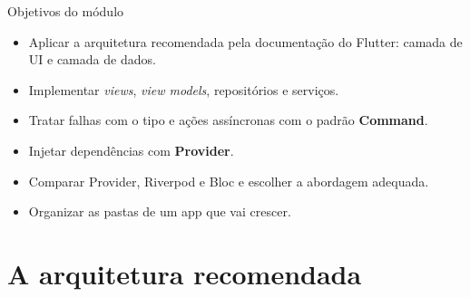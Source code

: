 \documentclass[aspectratio=169,10pt]{beamer}
\begin{document}
\capa

\begin{frame}{Objetivos do módulo}
  \begin{conceito}
    \begin{itemize}
      \item Aplicar a arquitetura recomendada pela documentação do Flutter: camada de UI e camada de dados.
      \item Implementar \emph{views}, \emph{view models}, repositórios e serviços.
      \item Tratar falhas com o tipo  e ações assíncronas com o padrão \textbf{Command}.
      \item Injetar dependências com \textbf{Provider}.
      \item Comparar Provider, Riverpod e Bloc e escolher a abordagem adequada.
      \item Organizar as pastas de um app que vai crescer.
    \end{itemize}
  \end{conceito}
\end{frame}

\sumario



\section{A arquitetura recomendada}
\end{document}
